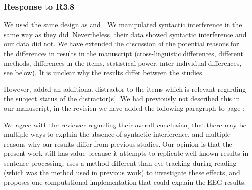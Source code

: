 \documentclass[12pt]{article}
\begin{document}
\subsubsection*{Response to R3.8}
We used the same design as \textcite{vandyke07} and \textcite{mertzen}. We manipulated syntactic interference in the same way as they did. Nevertheless, their data showed syntactic interference and our data did not. We have extended the discussion of the potential reasons for the differences in results in the manuscript (cross-linguistic differences, different methods, differences in the items, statistical power, inter-individual differences, see below). It is unclear why the results differ between the studies. 

However, \textcite{mertzen} added an additional distractor to the items which is relevant regarding the subject status of the distractor(s). We had previously not described this in our manuscript, in the revision we have added the following paragraph to page \pageref{items_mertzen}:

\setcounter{exx}{5}
\begin{quote}
\end{quote}

We agree with the reviewer regarding their overall conclusion, that there may be multiple ways to explain the absence of syntactic interference, and multiple reasons why our results differ from previous studies. Our opinion is that the present work still has value because it attempts to replicate well-known results in sentence processing, uses a method different than eye-tracking during reading (which was the method used in previous work) to investigate these effects, and proposes one computational implementation that could explain the EEG results.
\end{document}

